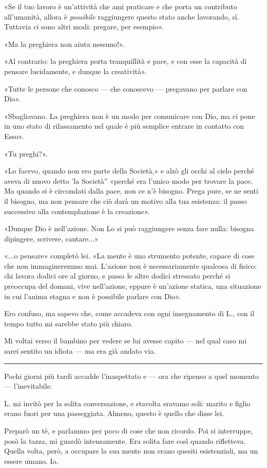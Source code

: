 \documentclass[a4paper,11pt,oneside,openright,final]{memoir}
\begin{document}
«Se il tuo lavoro è un'attività che ami praticare e che porta un contributo
all'umanità, allora è \emph{possibile} raggiungere questo stato anche lavorando,
sì. Tuttavia ci sono altri modi: pregare, per esempio».

«Ma la preghiera non aiuta nessuno!».

«Al contrario: la preghiera porta tranquillità e pace, e con esse la capacità
di pensare lucidamente, e dunque la creatività».

«Tutte le persone che conosco --- che conoscevo --- pregavano per parlare con
Dio».

«Sbagliavano. La preghiera non è un modo per comunicare con Dio, ma ci pone in
uno stato di rilassamento nel quale è più semplice entrare in contatto con
Esso».

«Tu preghi?».

«Lo facevo, quando non ero parte della Società,» e alzò gli occhi al cielo
perché aveva di nuovo detto 'la Società'' «perché era l'unico modo per trovare
la pace. Ma quando si è circondati dalla pace, non ce n'è bisogno. Prega pure,
se ne senti il bisogno, ma non pensare che ciò darà un motivo alla tua
esistenza: il passo successivo alla contemplazione è la creazione».

«Dunque Dio è nell'azione. Non Lo si può raggiungere senza fare nulla: bisogna
dipingere, scrivere, cantare...»

«...o pensare» completò lei. «La mente è uno strumento potente, capace di cose
che non immagineremmo mai. L'azione non è necessariamente qualcosa di fisico:
chi lavora dodici ore al giorno, e passa le altre dodici stressato perché si
preoccupa del domani, vive nell'azione, eppure è un'azione statica, una
situazione in cui l'anima stagna e non è possibile parlare con Dio».

Ero confuso, ma sapevo che, come accadeva con ogni insegnamento di L., con il
tempo tutto mi sarebbe stato più chiaro.

Mi voltai verso il bambino per vedere se lui avesse capito --- nel qual caso mi
sarei sentito un idiota --- ma era già andato via.

\plainbreak{1}

Pochi giorni più tardi accadde l'inaspettato e --- ora che ripenso a quel
momento --- l'inevitabile.

L. mi invitò per la solita conversazione, e stavolta eravamo soli: marito e
figlio erano fuori per una passeggiata. Almeno, questo è quello che disse lei.

Preparò un tè, e parlammo per poco di cose che non ricordo. Poi si interruppe,
posò la tazza, mi guardò intensamente. Era solita fare così quando rifletteva.
Quella volta, però, a occupare la sua mente non erano quesiti esistenziali, ma
un essere umano. Io.
\end{document}
